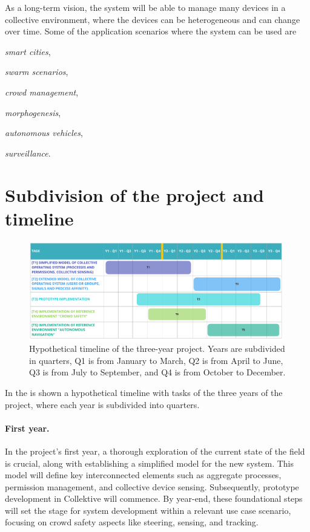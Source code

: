 \documentclass[12pt, a4paper]{article}
\newenvironment{inlinelist}{\begin{enumerate*}[label=\emph{(\roman*)}]}{\end{enumerate*}}
\begin{document}
As a long-term vision,
the system will be able to manage many devices in a collective environment,
where the devices can be heterogeneous and can change over time.
%
Some of the application scenarios where the system can be used are
\begin{inlinelist}
    \item \emph{smart cities},
    \item \emph{swarm scenarios},
    \item \emph{crowd management},
    \item \emph{morphogenesis},
    \item \emph{autonomous vehicles},
    \item \emph{surveillance}.
\end{inlinelist}

\section{Subdivision of the project and timeline}
\label{sec:subdivision-of-the-project-and-timeline}

\begin{figure}
    \centering
    \includegraphics[width=0.99\textwidth]{figures/timeline}
    \caption{Hypothetical timeline of the three-year project.
        Years are subdivided in quarters, Q1 is from January to March,
        Q2 is from April to June, Q3 is from July to September, and Q4 is from October to December.
    }\label{fig:timeline}
\end{figure}

In the  is shown a hypothetical timeline with tasks of the three years of the project,
where each year is subdivided into quarters.

\sloppypar
\paragraph{First year.}
In the project's first year,
a thorough exploration of the current state of the field is crucial,
along with establishing a simplified model for the new system.
%
This model will define key interconnected elements such as aggregate processes,
permission management, and collective device sensing.
%
Subsequently,
prototype development in Collektive will commence.
%
By year-end,
these foundational steps will set the stage for system development within a relevant use case scenario,
focusing on crowd safety aspects like steering, sensing, and tracking.
\end{document}
